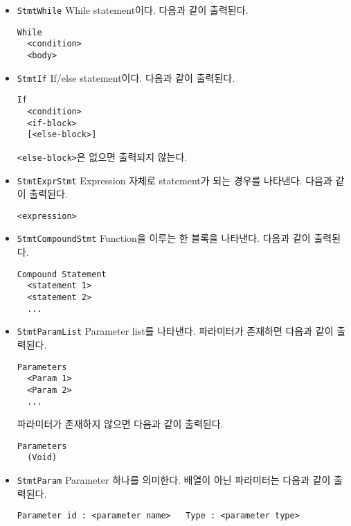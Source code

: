 \documentclass[a4paper, 10pt]{oblivoir}
\begin{document}
\begin{itemize}
\item \texttt{StmtWhile} \newline
While statement이다. 다음과 같이 출력된다.
\begin{lstlisting}[frame=single]
While
  <condition>
  <body>
\end{lstlisting}

\item \texttt{StmtIf} \newline
If/else statement이다. 다음과 같이 출력된다.
\begin{lstlisting}[frame=single]
If
  <condition>
  <if-block>
  [<else-block>]
\end{lstlisting}
\texttt{<else-block>}은 없으면 출력되지 않는다.

\item \texttt{StmtExprStmt} \newline
Expression 자체로 statement가 되는 경우를 나타낸다. 다음과 같이 출력된다.
\begin{lstlisting}[frame=single]
<expression>
\end{lstlisting}

\item \texttt{StmtCompoundStmt} \newline
Function을 이루는 한 블록을 나타낸다. 다음과 같이 출력된다.
\begin{lstlisting}[frame=single]
Compound Statement
  <statement 1>
  <statement 2>
  ...
\end{lstlisting}

\item \texttt{StmtParamList} \newline
Parameter list를 나타낸다. 파라미터가 존재하면 다음과 같이 출력된다.
\begin{lstlisting}[frame=single]
Parameters
  <Param 1>
  <Param 2>
  ...
\end{lstlisting}

파라미터가 존재하지 않으면 다음과 같이 출력된다.
\begin{lstlisting}[frame=single]
Parameters
  (Void)
\end{lstlisting}

\item \texttt{StmtParam} \newline
Parameter 하나를 의미한다. 배열이 아닌 파라미터는 다음과 같이 출력된다.
\begin{lstlisting}[frame=single]
Parameter id : <parameter name>   Type : <parameter type>
\end{lstlisting}


\end{itemize}
\end{document}
